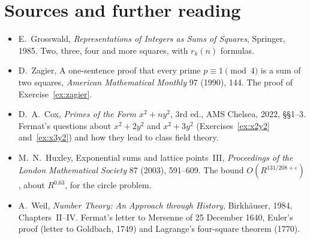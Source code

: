 \section*{Sources and further reading}

\begin{itemize}
\item E.~Grosswald, \emph{Representations of Integers as Sums of Squares}, Springer, 1985. Two, three, four and more squares, with $r_k(n)$ formulas.
\item D.~Zagier, A one-sentence proof that every prime $p\equiv1\pmod4$ is a sum of two squares, \emph{American Mathematical Monthly} 97 (1990), 144. The proof of Exercise~\ref{ex:zagier}.
\item D.~A.~Cox, \emph{Primes of the Form $x^2+ny^2$}, 3rd ed., AMS Chelsea, 2022, \S\S1--3. Fermat's questions about $x^2+2y^2$ and $x^2+3y^2$ (Exercises~\ref{ex:x2y2} and~\ref{ex:x3y2}) and how they lead to class field theory.
\item M.~N.~Huxley, Exponential sums and lattice points~III, \emph{Proceedings of the London Mathematical Society} 87 (2003), 591--609. The bound $O(R^{131/208+\varepsilon})$, about $R^{0.63}$, for the circle problem.
\item A.~Weil, \emph{Number Theory: An Approach through History}, Birkh\"auser, 1984, Chapters~II--IV. Fermat's letter to Mersenne of 25 December 1640, Euler's proof (letter to Goldbach, 1749) and Lagrange's four-square theorem (1770).
\end{itemize}
